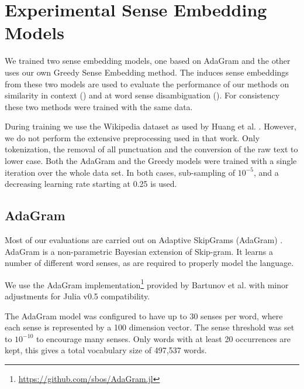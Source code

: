 \documentclass{article} %
\def\parencite{\cite} %
\providecommand{\DIFaddbegin}{} %
\providecommand{\DIFaddend}{} %
\begin{document}
\section{Experimental Sense Embedding Models} 
\DIFaddbegin \label{Models}
\DIFaddend We trained two sense embedding models, one based on AdaGram \parencite{AdaGrams} 
and the other uses our own Greedy Sense Embedding method. 
The induces sense embeddings from these two models are used to evaluate the performance of our methods on similarity in context () and at word sense disambiguation (). For consistency these two methods were trained with the same data.

During training we use the Wikipedia dataset as used by Huang et al. \parencite{Huang2012}.
However, we do not perform the extensive preprocessing used in that work.
Only tokenization, the removal of all punctuation and the conversion of the raw text to lower case.
Both the AdaGram and the Greedy models were trained with a single iteration over the whole data set.
In both cases, sub-sampling of $10^{-5}$, and a decreasing learning rate starting at 0.25 is used.

\subsection{AdaGram}
Most of our evaluations are carried out on Adaptive SkipGrams (AdaGram) \parencite{AdaGrams}. AdaGram is a non-parametric Bayesian extension of Skip-gram. It learns a number of different word senses, as are required to properly model the language.

We use the AdaGram  implementation\footnote{\url{https://github.com/sbos/AdaGram.jl}} provided by Bartunov et al. \parencite{AdaGrams} with minor adjustments for Julia \parencite{Julia} v0.5 compatibility.


The AdaGram model was configured to have up to 30 senses per word, where each sense is represented by a 100 dimension vector. 
The sense threshold was set to $10^{-10}$ to encourage many senses.
Only words with at least 20 occurrences are kept, this gives a total vocabulary size of 497,537 words.




\end{document}
